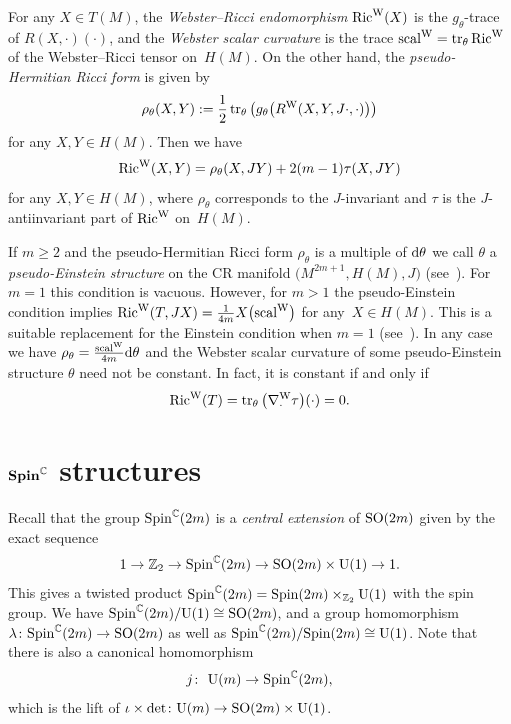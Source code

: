 \documentclass[10pt,a4paper]{amsart}
\numberwithin{equation}{section}
\newcommand{\ZZ}{\mathbb{Z}}
\newcommand{\CC}{\mathbb{C}}
\begin{document}
For any $X\in T(M)$, the {\em Webster--Ricci endomorphism} $\operatorname{Ric}^{\rm W}(X)$ is the $g_\theta$-trace of $R(X,\cdot)(\cdot)$, and
the {\em Webster scalar curvature} is the trace $\operatorname{scal}^{\rm W}=\operatorname{tr}_\theta \operatorname{Ric}^{\rm W}$ of the Webster--Ricci tensor on~$H(M)$.
On the other hand, the {\em pseudo-Hermitian Ricci form} is given by
\[
\rho_\theta(X,Y) := \frac{1}{2}\operatorname{tr}_\theta\big( g_\theta\big(R^{\rm W}(X,Y,J\cdot,\cdot)\big)\big)
\]
for any $X,Y\in H(M)$.
Then we have
\[
\operatorname{Ric}^{\rm W}(X,Y) = \rho_\theta(X,JY) + 2(m-1)\tau(X,JY)
\]
for any $X,Y\in H(M)$, where $\rho_\theta$ corresponds to the $J$-invariant and $\tau$ is the $J$-antiinvariant part of $\operatorname{Ric}^{\rm W}$ on~$H(M)$.

If $m\geq 2$ and the pseudo-Hermitian Ricci form $\rho_\theta$ is a multiple of ${\rm d}\theta$ we call $\theta$ a {\em pseudo-Einstein structure}
on the CR manifold $\big(M^{2m+1},H(M),J\big)$ (see~\cite{Lee}). For $m=1$ this condition is vacuous. However, for $m>1$ the pseudo-Einstein condition implies
 $\operatorname{Ric}^{\rm W}(T,JX)=\frac{1}{4m}X\big({\rm scal}^{\rm W}\big)$ for any~$X\in H(M)$. This is a suitable replacement for the Einstein condition when $m=1$ (see~\cite{CY}).
In any case we have $\rho_\theta=\frac{{\rm scal}^{\rm W}}{4m}{\rm d}\theta$ and the Webster scalar curvature of some pseudo-Einstein structure $\theta$
need not be constant. In fact, it
is constant if and only if
\[\operatorname{Ric}^{\rm W}(T) = \operatorname{tr}_\theta\big(\nabla^{\rm W}_{\cdot}\tau\big)(\cdot) = 0.\]

\section[Spin C structures]{$\boldsymbol{{\rm Spin}^\CC}$ structures} \label{Sec4}

Recall that the group ${\rm Spin}^\CC(2m)$ is a {\em central extension} of ${\rm SO}(2m)$ given by the exact sequence
\[
1 \to \ZZ_2 \to {\rm Spin}^\CC(2m) \to {\rm SO}(2m)\times {\rm U}(1) \to 1.
\]
This gives a twisted product ${\rm Spin}^\CC(2m)={\rm Spin}(2m)\times_{\ZZ_2}{\rm U}(1)$ with the spin group. We have
${\rm Spin}^\CC(2m)/{\rm U}(1)\cong {\rm SO}(2m)$, and a group homomorphism $\lambda\colon {\rm Spin}^\CC(2m)\to {\rm SO}(2m)$ as well as
${\rm Spin}^\CC(2m)/{\rm Spin}(2m)\cong {\rm U}(1)$. Note that there is also a canonical homomorphism
\[
j\colon \ {\rm U}(m) \to {\rm Spin}^{\CC}(2m),
\]
which is the lift of $\iota\times \det\colon {\rm U}(m)\to {\rm SO}(2m)\times {\rm U}(1)$.
\end{document}
